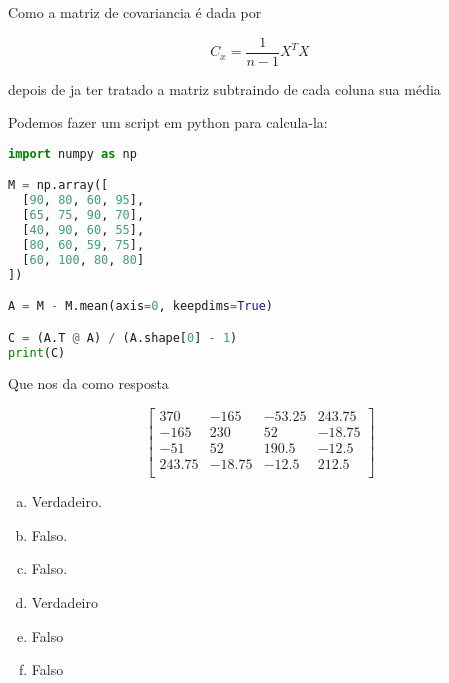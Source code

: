 \documentclass[11pt]{article}
\begin{document}
\begin{exerc}
\begin{enumerate}[a.]
Como a matriz de covariancia é dada por

$$C_x = \frac{1}{n - 1}X^TX$$

depois de ja ter tratado a matriz subtraindo de cada coluna sua média


Podemos fazer um script em python para calcula-la:
\begin{lstlisting}[language=Python]
import numpy as np

M = np.array([
  [90, 80, 60, 95],
  [65, 75, 90, 70],
  [40, 90, 60, 55],
  [80, 60, 59, 75],
  [60, 100, 80, 80]
])

A = M - M.mean(axis=0, keepdims=True)

C = (A.T @ A) / (A.shape[0] - 1)
print(C)
\end{lstlisting}

Que nos da como resposta

$$\begin{bmatrix}
	370 & -165 & -53.25 & 243.75\\
	-165 & 230 & 52 & -18.75\\
	-51 & 52 & 190.5 & -12.5\\
	243.75 & -18.75 & -12.5 & 212.5\\
\end{bmatrix}$$


\end{enumerate}
\end{exerc}

\newpage

\begin{exerc}
\begin{enumerate}[a.]
.
\item
Verdadeiro.

\item
Falso.

\item
Falso.

\item
Verdadeiro

\item
Falso

\item
Falso

\end{enumerate}
\end{exerc}
\end{document}
